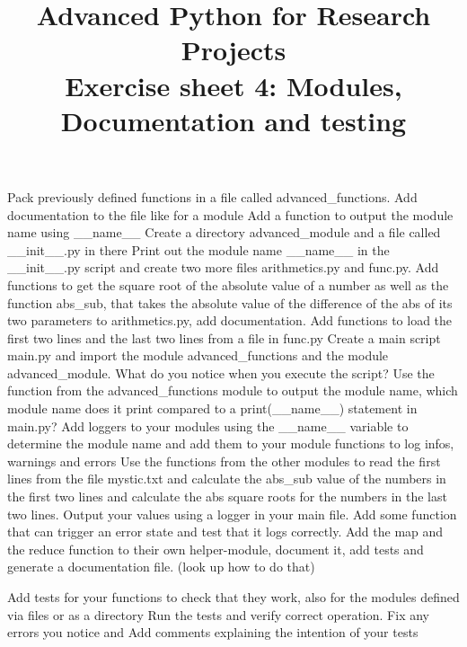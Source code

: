 \documentclass[]{erlangen-problemset}
\title{{\Large Advanced Python for Research Projects} \\[0.3cm] 
Exercise sheet 4: Modules, Documentation and testing}
\begin{document}


\begin{problem}[title={Using files and directories as modules}]
\noindent
\Question Pack previously defined functions in a file called advanced_functions.
\Question Add documentation to the file like for a module 
\Question Add a function to output the module name using \_\_name\_\_
\Question Create a directory advanced\_module and a file called \_\_init\_\_.py in there
\Question Print out the module name \_\_name\_\_ in the \_\_init\_\_.py script and create two more files arithmetics.py and func.py. 
Add functions to get the square root of the absolute value of a number as well as the function abs\_sub, that takes the absolute value of the difference of the abs of its two parameters to arithmetics.py, add documentation. 
Add functions to load the first two lines and the last two lines from a file in func.py
\Question Create a main script main.py and import the module advanced_functions and the module advanced_module. 
What do you notice when you execute the script? 
\Question Use the function from the advanced\_functions module to output the module name, which module name does it print compared to a print(\_\_name\_\_) statement in main.py?
\Question Add loggers to your modules using the \_\_name\_\_ variable to determine the module name and add them to your module functions to log infos, warnings and errors
\Question Use the functions from the other modules to read the first lines from the file mystic.txt and calculate the abs\_sub value of the numbers in the first two lines and calculate the abs square roots for the numbers in the last two lines. Output your values using a logger in your main file. 
\Question Add some function that can trigger an error state and test that it logs correctly. 
\Question Add the map and the reduce function to their own helper-module, document it, add tests and generate a documentation file. (look up how to do that)
\end{problem}


\begin{problem}[title={Building tests for our modules}]
\noindent
\Question Add tests for your functions to check that they work, also for the modules defined via files or as a directory
\Question Run the tests and verify correct operation. Fix any errors you notice and Add comments explaining the intention of your tests
\end{problem}
\end{document}
